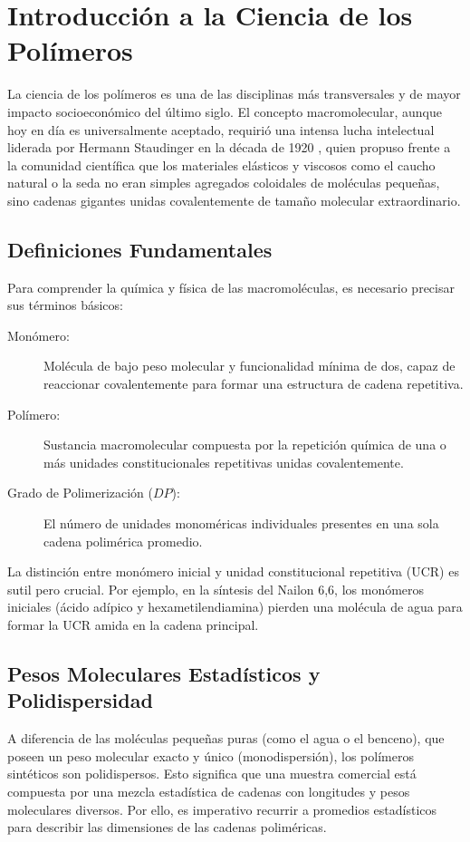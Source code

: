 \chapter{Introducción a la Ciencia de los Polímeros}
\label{cap:intro}

La ciencia de los polímeros es una de las disciplinas más transversales y de mayor impacto socioeconómico del último siglo. El concepto macromolecular, aunque hoy en día es universalmente aceptado, requirió una intensa lucha intelectual liderada por Hermann Staudinger en la década de 1920 \cite{staudinger1920}, quien propuso frente a la comunidad científica que los materiales elásticos y viscosos como el caucho natural o la seda no eran simples agregados coloidales de moléculas pequeñas, sino cadenas gigantes unidas covalentemente de tamaño molecular extraordinario.

\section{Definiciones Fundamentales}

Para comprender la química y física de las macromoléculas, es necesario precisar sus términos básicos:
\begin{description}
    \item[Monómero:] Molécula de bajo peso molecular y funcionalidad mínima de dos, capaz de reaccionar covalentemente para formar una estructura de cadena repetitiva.
    \item[Polímero:] Sustancia macromolecular compuesta por la repetición química de una o más unidades constitucionales repetitivas unidas covalentemente.
    \item[Grado de Polimerización ($DP$):] El número de unidades monoméricas individuales presentes en una sola cadena polimérica promedio.
\end{description}

La distinción entre monómero inicial y unidad constitucional repetitiva (UCR) es sutil pero crucial. Por ejemplo, en la síntesis del Nailon 6,6, los monómeros iniciales (ácido adípico y hexametilendiamina) pierden una molécula de agua para formar la UCR amida en la cadena principal.

\section{Pesos Moleculares Estadísticos y Polidispersidad}

A diferencia de las moléculas pequeñas puras (como el agua o el benceno), que poseen un peso molecular exacto y único (monodispersión), los polímeros sintéticos son polidispersos. Esto significa que una muestra comercial está compuesta por una mezcla estadística de cadenas con longitudes y pesos moleculares diversos. Por ello, es imperativo recurrir a promedios estadísticos para describir las dimensiones de las cadenas poliméricas.

